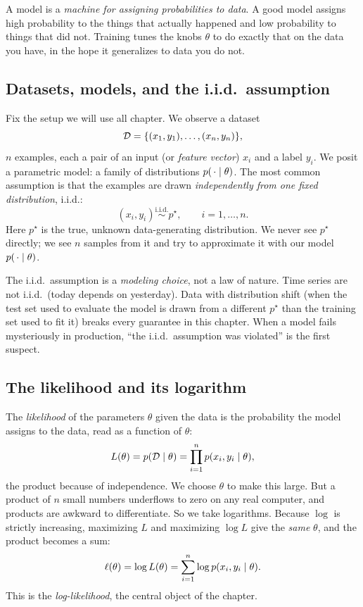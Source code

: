 \begin{intuitionbox}
A model is a \emph{machine for assigning probabilities to data}. A good model
assigns high probability to the things that actually happened and low
probability to things that did not. Training tunes the knobs $\theta$ to do
exactly that on the data you have, in the hope it generalizes to data you do not.
\end{intuitionbox}

\subsection{Datasets, models, and the i.i.d.\ assumption}

Fix the setup we will use all chapter. We observe a dataset
\[
  \mathcal{D} = \{(x_1,y_1),\dots,(x_n,y_n)\},
\]
$n$ examples, each a pair of an input (or \emph{feature vector}) $x_i$ and a
label $y_i$. We posit a parametric model: a family of distributions
$p(\,\cdot \mid \theta)$. The most common assumption is that the examples are drawn \emph{independently from one
fixed distribution}, i.i.d.:
\[
  (x_i,y_i) \overset{\text{i.i.d.}}{\sim} p^\star, \qquad i=1,\dots,n.
\]
Here $p^\star$ is the true, unknown data-generating distribution. We never see
$p^\star$ directly; we see $n$ samples from it and try to approximate it with our
model $p(\,\cdot\mid\theta)$.

\begin{trapbox}
The i.i.d.\ assumption is a \emph{modeling choice}, not a law of nature. Time
series are not i.i.d.\ (today depends on yesterday). Data with distribution
shift (when the test set used to evaluate the model is drawn from a different $p^\star$ than the training set used to fit it) breaks every guarantee in this chapter. When a model fails mysteriously in
production, ``the i.i.d.\ assumption was violated'' is the first suspect.
\end{trapbox}

\subsection{The likelihood and its logarithm}

The \emph{likelihood} of the parameters $\theta$ given the data is the
probability the model assigns to the data, read as a function of $\theta$:
\[
  L(\theta) = p(\mathcal{D}\mid\theta) = \prod_{i=1}^n p(x_i,y_i\mid\theta),
\]
the product because of independence. We choose $\theta$ to make this large. But a
product of $n$ small numbers underflows to zero on any real computer, and
products are awkward to differentiate. So we take logarithms. Because $\log$ is
strictly increasing, maximizing $L$ and maximizing $\log L$ give the \emph{same}
$\theta$, and the product becomes a sum:
\[
  \ell(\theta) = \log L(\theta) = \sum_{i=1}^n \log p(x_i,y_i\mid\theta).
\]
This is the \emph{log-likelihood}, the central object of the chapter.

